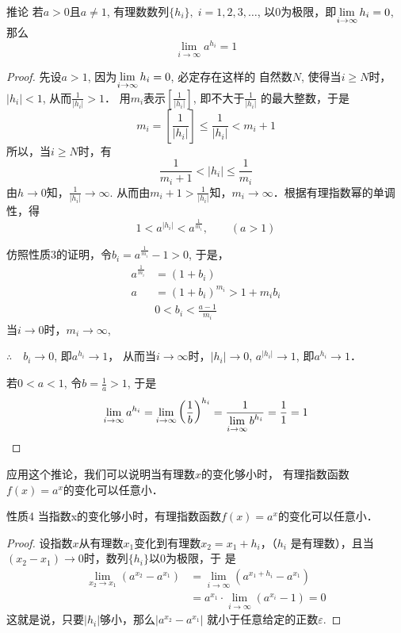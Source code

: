 \begin{blk}{推论}
   若$a>0$且$a\ne 1$, 有理数数列$\{h_i\},\; i=1,2,3,\ldots$,
以0为极限，即$\displaystyle\lim_{i\to\infty}h_i=0$, 那么
\[\lim_{i\to\infty}a^{h_i}=1\]
\end{blk}

\begin{proof}
  先设$a>1$, 因为$\displaystyle\lim_{i\to\infty}h_i=0$, 必定存在这样的
自然数$N$, 使得当$i\ge N$时，$|h_i|<1$, 从而$\frac{1}{|h_i|}>1$．
用$m_i$表示$\left[\frac{1}{|h_i|}\right]$,
即不大于$\frac{1}{|h_i|}$
的最大整数，于是
\begin{equation}
  m_i=\left[\frac{1}{|h_i|}\right]\le \frac{1}{|h_i|}<m_i+1
\end{equation}
所以，当$i\ge N$时，有
\[\frac{1}{m_i+1}<|h_i|\le\frac{1}{m_i}\]
由$h\to 0$知，$\frac{1}{|h_i|}\to \infty$. 从而由$m_i+1>\frac{1}{|h_i|}$知，$m_i\to\infty$．根据有理指数幂的单调性，得
\[1<a^{|h_i|}<a^{\tfrac{1}{m_i}},\qquad (a>1)\]

仿照性质3的证明，令$b_i=a^{\tfrac{1}{m_i}}-1>0$, 于是，
\[\begin{split}
  a^{\tfrac{1}{m_i}}&=(1+b_i)\\
  a&=(1+b_i)^{m_i}>1+m_ib_i\\
  & 0<b_i<\frac{a-1}{m_i}
\end{split}\]
当$i\to 0$时，$m_i\to \infty$,

$\therefore\quad b_i\to 0$, 即$a^{h_i}\to 1$， 从而当$i\to \infty$时，$|h_i|\to 0$, $a^{|h_i|}\to 1$, 即$a^{h_i}\to 1$．

若$0<a<1$, 令$b=\frac{1}{a}>1$, 于是
\[\lim_{i\to \infty} a^{h_i}=\lim_{i\to \infty} \left(\dfrac{1}{b}\right)^{h_i}=\dfrac{1}{\displaystyle\lim_{i\to \infty} b^{h_i}}=\dfrac{1}{1}=1\]
\end{proof}

应用这个推论，我们可以说明当有理数$x$的变化够小时，
有理指数函数$f(x)=a^x$的变化可以任意小．

\begin{blk}{性质4}
   当指数x的变化够小时，有理指数函数$f(x)=
a^x$的变化可以任意小．
\end{blk}

\begin{proof}
  设指数$x$从有理数$x_1$变化到有理数$x_2=x_1+h_i$，（$h_i$
是有理数），且当$(x_2-x_1)\to 0$时，数列$\{h_i\}$以0为极限，于
是
\[\begin{split}
  \lim_{x_2\to x_1}\left(a^{x_2}-a^{x_1}\right)&=\lim_{i\to \infty}\left(a^{x_1+h_i}-a^{x_1}\right)\\
  &=a^{x_1}\cdot \lim_{i\to \infty}\left(a^{x_i}-1\right)=0
\end{split}\]
这就是说，只要$|h_i|$够小，那么$|a^{x_2}-a^{x_1}|$
就小于任意给定的正数$\varepsilon$.
\end{proof}


